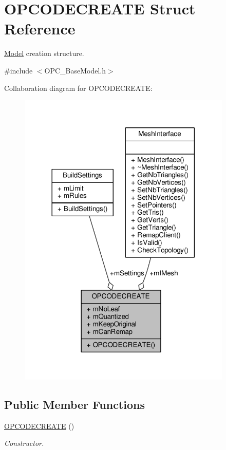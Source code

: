 \hypertarget{structOPCODECREATE}{}\section{O\+P\+C\+O\+D\+E\+C\+R\+E\+A\+TE Struct Reference}
\label{structOPCODECREATE}


\hyperlink{classModel}{Model} creation structure.  




{\ttfamily \#include $<$O\+P\+C\+\_\+\+Base\+Model.\+h$>$}



Collaboration diagram for O\+P\+C\+O\+D\+E\+C\+R\+E\+A\+TE\+:
\nopagebreak
\begin{figure}[H]
\begin{center}
\leavevmode
\includegraphics[width=288pt]{d7/d07/structOPCODECREATE__coll__graph}
\end{center}
\end{figure}
\subsection*{Public Member Functions}
\begin{DoxyCompactItemize}
\item 
\hyperlink{structOPCODECREATE_a7e0b19c00a6986b00db60be7bead9886}{O\+P\+C\+O\+D\+E\+C\+R\+E\+A\+TE} ()\hypertarget{structOPCODECREATE_a7e0b19c00a6986b00db60be7bead9886}{}\label{structOPCODECREATE_a7e0b19c00a6986b00db60be7bead9886}

\begin{DoxyCompactList}\small\item\em Constructor. \end{DoxyCompactList}\end{DoxyCompactItemize}
